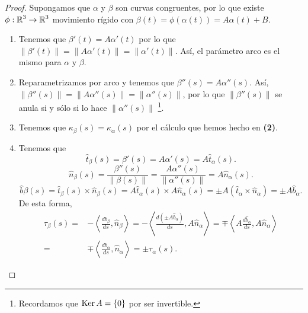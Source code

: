 \begin{proof} Supongamos que $\displaystyle \alpha  $ y $\displaystyle \beta  $ son curvas congruentes, por lo que existe $\displaystyle \phi : \mathbb{R}^{3}\to \mathbb{R}^{3} $ movimiento rígido con $\displaystyle \beta\left(t\right) = \phi\left(\alpha\left(t\right)\right) = A\alpha\left(t\right) + B$. 
\begin{enumerate}
\item Tenemos que $\displaystyle \beta'\left(t\right)=A\alpha'\left(t\right) $ por lo que $\displaystyle \|\beta'\left(t\right)\| = \|A\alpha'\left(t\right)\| = \|\alpha'\left(t\right)\| $. Así, el parámetro arco es el mismo para $\displaystyle \alpha  $ y $\displaystyle \beta  $. 
\item Reparametrizamos por arco y tenemos que $\displaystyle \beta''\left(s\right)=A\alpha''\left(s\right) $. Así, $\displaystyle \|\beta''\left(s\right)\| = \|A\alpha''\left(s\right)\| = \|\alpha''\left(s\right)\| $, por lo que $\displaystyle \|\beta''\left(s\right)\| $ se anula si y sólo si lo hace $\displaystyle \|\alpha''\left(s\right)\| $ \footnote{Recordamos que $\displaystyle \operatorname{Ker} A = \left\{ 0\right\}  $ por ser invertible.}.
\item Tenemos que $\displaystyle \kappa_{\beta }\left(s\right)=\kappa_{\alpha }\left(s\right) $ por el cálculo que hemos hecho en \textbf{(2)}. 
\item Tenemos que 
	\[\hat{t}_{\beta }\left(s\right)=\beta'\left(s\right)=A\alpha'\left(s\right)=A\hat{t}_{\alpha }\left(s\right) .\]
	\[\hat{n}_{\beta }\left(s\right)=\frac{\beta''\left(s\right)}{\|\beta\left(s\right)\|}=\frac{A\alpha''\left(s\right)}{\|\alpha''\left(s\right)\|}=A\hat{n}_{\alpha }\left(s\right) .\]
	\[\hat{b}{\beta }\left(s\right)=\hat{t}_{\beta }\left(s\right) \times \hat{n}_{\beta }\left(s\right)=A\hat{t}_{\alpha }\left(s\right)\times A \hat{n}_{\alpha }\left(s\right)=\pm A\left(\hat{t}_{\alpha }\times \hat{n}_{\alpha }\right)=\pm A \hat{b}_{\alpha } .\]
De esta forma, 
\[
\begin{split}
	\tau_{\beta }\left(s\right)= &-\left\langle \frac{d\hat{b}_{\beta }}{d s}, \hat{n}_{\beta } \right\rangle =-\left\langle \frac{d\left(\pm A \hat{b}_{\alpha }\right)}{d s}, A \hat{n}_{\alpha } \right\rangle 
	=  \mp \left\langle A \frac{d\hat{b}_{\alpha }}{d s}, A \hat{n}_{\alpha } \right\rangle \\
	= &  \mp \left\langle \frac{d\hat{b}_{\alpha} }{d s}, \hat{n}_{\alpha } \right\rangle =\pm \tau_{\alpha }\left(s\right).
\end{split}
\]
\end{enumerate}
\end{proof}

